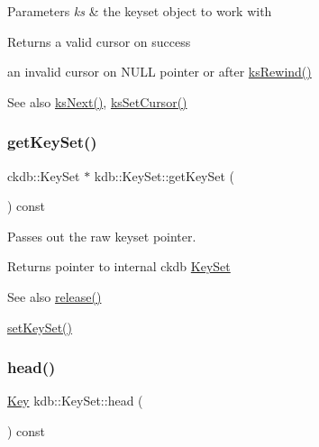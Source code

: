\begin{DoxyParams}{Parameters}
{\em ks} & the keyset object to work with \\
\hline
\end{DoxyParams}
\begin{DoxyReturn}{Returns}
a valid cursor on success 

an invalid cursor on N\+U\+LL pointer or after \mbox{\hyperlink{group__keyset_gabe793ff51f1728e3429c84a8a9086b70}{ks\+Rewind()}} 
\end{DoxyReturn}
\begin{DoxySeeAlso}{See also}
\mbox{\hyperlink{group__keyset_ga317321c9065b5a4b3e33fe1c399bcec9}{ks\+Next()}}, \mbox{\hyperlink{group__keyset_gad94c9ffaa3e8034564c0712fd407c345}{ks\+Set\+Cursor()}} 
\end{DoxySeeAlso}
\mbox{\label{classkdb_1_1KeySet_a4e9a3906e0b18a783f8a6e8bdbec9ed0}} 
\subsubsection{\texorpdfstring{getKeySet()}{getKeySet()}}
{\footnotesize\ttfamily ckdb\+::\+Key\+Set $\ast$ kdb\+::\+Key\+Set\+::get\+Key\+Set (\begin{DoxyParamCaption}{ }\end{DoxyParamCaption}) const\hspace{0.3cm}{\ttfamily [inline]}}



Passes out the raw keyset pointer. 

\begin{DoxyReturn}{Returns}
pointer to internal ckdb \mbox{\hyperlink{classkdb_1_1KeySet}{Key\+Set}}
\end{DoxyReturn}
\begin{DoxySeeAlso}{See also}
\mbox{\hyperlink{classkdb_1_1KeySet_a2987b3fb1b12196399650726f1c18f02}{release()}} 

\mbox{\hyperlink{classkdb_1_1KeySet_a9f3ec4eebe304185527b08a6fa01b77c}{set\+Key\+Set()}} 
\end{DoxySeeAlso}
\mbox{\label{classkdb_1_1KeySet_a1aca3689ed08cbc909976cdf874cfb59}} 
\subsubsection{\texorpdfstring{head()}{head()}}
{\footnotesize\ttfamily \mbox{\hyperlink{classkdb_1_1Key}{Key}} kdb\+::\+Key\+Set\+::head (\begin{DoxyParamCaption}{ }\end{DoxyParamCaption}) const\hspace{0.3cm}{\ttfamily [inline]}}



